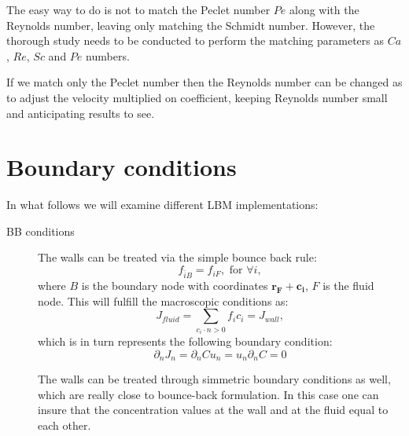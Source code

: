 \documentclass{article}
\begin{document}
The easy way to do is not to match the Peclet number $Pe$ along with the Reynolds number, leaving
only matching the Schmidt number. However, the thorough study needs to be conducted to perform the
matching parameters as $Ca$, $Re$, $Sc$ and $Pe$ numbers. 

If we match only the Peclet number then the Reynolds number can be changed as to adjust the
velocity multiplied on coefficient, keeping Reynolds number small and anticipating results to see.


\appendix

\section{Boundary conditions}
In what follows we will examine different LBM implementations:
\begin{description}
 \item[BB conditions] The walls can be treated via the simple bounce back rule:
\begin{equation}
f_{\bar{i}B}=f_{iF},\text{ for } \forall i,
\end{equation}
where $B$ is the boundary node with coordinates $\bm{r_F}+\bm{c_i}$, $F$ is the fluid node. This
will fulfill the macroscopic conditions as:
\begin{equation}
J_{fluid}= \sum_{c_i\cdot n>0}{f_i c_i}=J_{wall},
\end{equation}
which is in turn represents the following boundary condition:
\begin{equation}
\partial_n J_n=\partial_n C u_n = u_n \partial_n C=0
\end{equation}

The walls can be treated through simmetric boundary conditions as well, which are really close to
bounce-back formulation. In this case one can insure that the concentration values at the wall and
at the fluid equal to each other. 


\end{description}
\end{document}
